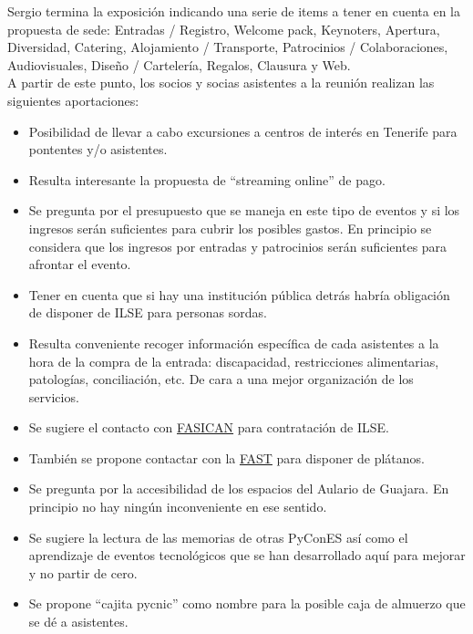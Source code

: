 \documentclass[a4paper,12pt]{article}
\begin{document}
Sergio termina la exposición indicando una serie de items a tener en cuenta en la propuesta de sede: Entradas / Registro, Welcome pack, Keynoters, Apertura, Diversidad, Catering, Alojamiento / Transporte, Patrocinios / Colaboraciones, Audiovisuales, Diseño / Cartelería, Regalos, Clausura y Web.\\

A partir de este punto, los socios y socias asistentes a la reunión realizan las siguientes aportaciones:

\begin{itemize}
    \item Posibilidad de llevar a cabo excursiones a centros de interés en Tenerife para pontentes y/o asistentes.
    \item Resulta interesante la propuesta de ``streaming online'' de pago.
    \item Se pregunta por el presupuesto que se maneja en este tipo de eventos y si los ingresos serán suficientes para cubrir los posibles gastos. En principio se considera que los ingresos por entradas y patrocinios serán suficientes para afrontar el evento.
    \item Tener en cuenta que si hay una institución pública detrás habría obligación de disponer de ILSE para personas sordas.
    \item Resulta conveniente recoger información específica de cada asistentes a la hora de la compra de la entrada: discapacidad, restricciones alimentarias, patologías, conciliación, etc. De cara a una mejor organización de los servicios.
    \item Se sugiere el contacto con \href{https://fasican.org/accesibilidad-en-medios-audiovisuales/}{FASICAN} para contratación de ILSE.
    \item También se propone contactar con la \href{https://lafast.org/}{FAST} para disponer de plátanos.
    \item Se pregunta por la accesibilidad de los espacios del Aulario de Guajara. En principio no hay ningún inconveniente en ese sentido.
    \item Se sugiere la lectura de las memorias de otras PyConES así como el aprendizaje de eventos tecnológicos que se han desarrollado aquí para mejorar y no partir de cero.
    \item Se propone ``cajita pycnic'' como nombre para la posible caja de almuerzo que se dé a asistentes.
\end{itemize}
\end{document}
